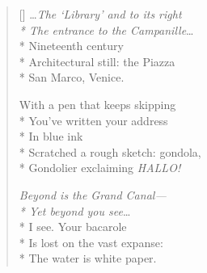 \label{ch:postcard}
\settowidth{\versewidth}{The entrance to the Campanille. . . .}
\begin{verse}[\versewidth]
\ldots\textit{The `Library' and to its right\\*
The entrance to the Campanille}\ldots\\*
Nineteenth century\\*
Architectural still: the Piazza\\*
San Marco, Venice.

With a pen that keeps skipping\\*
You've written your address\\*
In blue ink\\*
Scratched a rough sketch: gondola,\\*
Gondolier exclaiming \textit{HALLO!}

\textit{Beyond is the Grand Canal---\\*
Yet beyond you see}\ldots\\*
I see. Your bacarole\\*
Is lost on the vast expanse:\\*
The water is white paper.
\end{verse}
